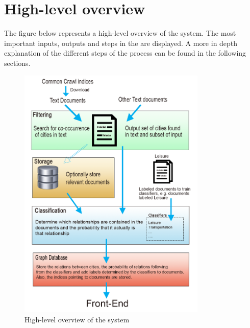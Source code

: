 \section{High-level overview}
The figure below represents a high-level overview of the system. The most important inputs, outputs and steps in the are displayed. A more in depth explanation of the different steps of the process can be found in the following sections.
\begin{figure}[h]
\centering
\includegraphics[width=0.8\textwidth]{System-overview-3}
\caption{High-level overview of the system}
\label{fig:overview}
\end{figure}